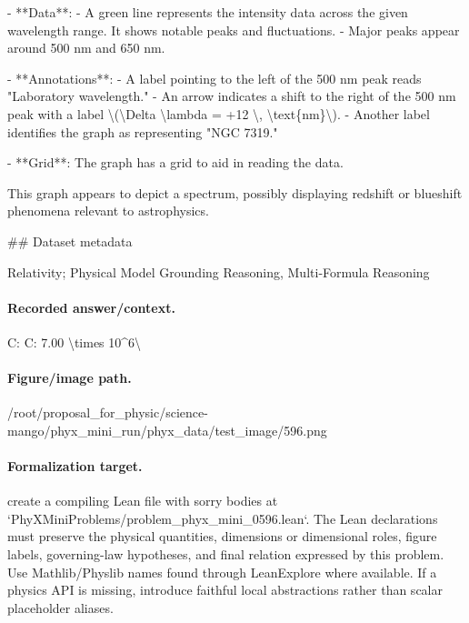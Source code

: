 - **Data**: 
  - A green line represents the intensity data across the given wavelength range. It shows notable peaks and fluctuations.
  - Major peaks appear around 500 nm and 650 nm.

- **Annotations**:
  - A label pointing to the left of the 500 nm peak reads "Laboratory wavelength."
  - An arrow indicates a shift to the right of the 500 nm peak with a label \textbackslash{}(\textbackslash{}Delta \textbackslash{}lambda = +12 \textbackslash{}, \textbackslash{}text\{nm\}\textbackslash{}).
  - Another label identifies the graph as representing "NGC 7319."

- **Grid**: The graph has a grid to aid in reading the data. 

This graph appears to depict a spectrum, possibly displaying redshift or blueshift phenomena relevant to astrophysics.

\#\# Dataset metadata

Relativity; Physical Model Grounding Reasoning, Multi-Formula Reasoning

\paragraph{Recorded answer/context.}
C: C: 7.00 \textbackslash{}times 10\textasciicircum{}6\textbackslash{}

\paragraph{Figure/image path.}
/root/proposal\_for\_physic/science-mango/phyx\_mini\_run/phyx\_data/test\_image/596.png

\paragraph{Formalization target.}
create a compiling Lean file with sorry bodies at `PhyXMiniProblems/problem\_phyx\_mini\_0596.lean`. The Lean declarations must preserve the physical quantities, dimensions or dimensional roles, figure labels, governing-law hypotheses, and final relation expressed by this problem.
Use Mathlib/Physlib names found through LeanExplore where available. If a physics API is missing, introduce faithful local abstractions rather than scalar placeholder aliases.

